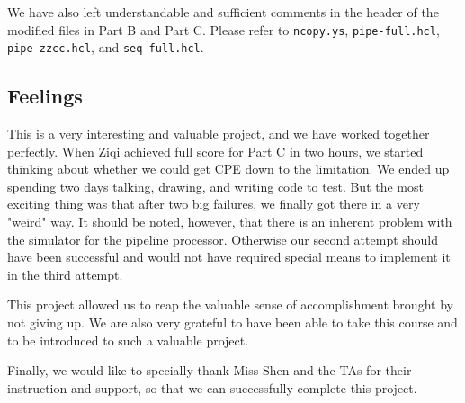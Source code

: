 \documentclass[12pt,a4paper]{article}
\begin{document}
We have also left understandable and sufficient comments in the header of the modified files in Part B and Part C. Please refer to \texttt{ncopy.ys}, \texttt{pipe-full.hcl}, \texttt{pipe-zzcc.hcl}, and \texttt{seq-full.hcl}.

\subsection{Feelings}
This is a very interesting and valuable project, and we have worked together perfectly. 
When Ziqi achieved full score for Part C in two hours, we started thinking about whether we could get CPE down to the limitation.
We ended up spending two days talking, drawing, and writing code to test.
But the most exciting thing was that after two big failures, we finally got there in a very "weird" way.
It should be noted, however, that there is an inherent problem with the simulator for the pipeline processor. 
Otherwise our second attempt should have been successful and would not have required special means to implement it in the third attempt.

This project allowed us to reap the valuable sense of accomplishment brought by not giving up. We are also very grateful to have been able to take this course and to be introduced to such a valuable project.

Finally, we would like to specially thank Miss Shen and the TAs for their instruction and support, so that we can successfully complete this project.
\end{document}
